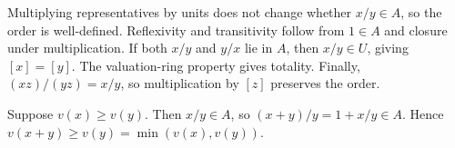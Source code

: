 Multiplying representatives by units does not change whether $x/y\in A$, so the order is well-defined. Reflexivity and transitivity follow from $1\in A$ and closure under multiplication. If both $x/y$ and $y/x$ lie in $A$, then $x/y\in U$, giving $[x]=[y]$. The valuation-ring property gives totality. Finally, $(xz)/(yz)=x/y$, so multiplication by $[z]$ preserves the order.

Suppose $v(x)\geq v(y)$. Then $x/y\in A$, so $(x+y)/y=1+x/y\in A$. Hence $v(x+y)\geq v(y)=\min(v(x),v(y))$.
